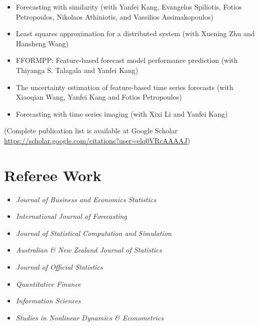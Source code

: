 \documentclass[twoside,a4paper,11pt]{amsart}
\begin{document}

\begin{itemize}

\item Forecasting with similarity (with Yanfei Kang, Evangelos Spiliotis, Fotios Petropoulos, Nikolaos Athiniotis, and Vassilios Assimakopoulos)

\item Least squares approximation for a distributed system (with Xuening Zhu and Hansheng Wang)

\item FFORMPP: Feature-based forecast model performance prediction (with Thiyanga S. Talagala and Yanfei Kang)

\item The uncertainty estimation of feature-based time series forecasts (with Xiaoqian Wang, Yanfei Kang and Fotios Petropoulos)

\item Forecasting with time series imaging (with Xixi Li and Yanfei Kang)

\end{itemize}

{\footnotesize (Complete publication list is available at Google Scholar
  \url{https://scholar.google.com/citations?user=elq0VRcAAAAJ})}


\section*{Referee Work}
\begin{itemize}
\item  \emph{Journal of Business and Economics Statistics}
\item  \emph{International Journal of Forecasting}
\item  \emph{Journal of Statistical Computation and Simulation}
\item  \emph{Australian \& New Zealand Journal of Statistics}
\item  \emph{Journal of Official Statistics}
\item  \emph{Quantitative Finance}
\item  \emph{Information Sciences}
\item  \emph{Studies in Nonlinear Dynamics \& Econometrics}

\end{itemize}
\end{document}
